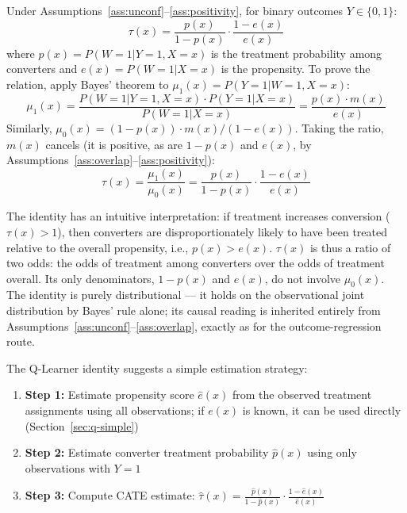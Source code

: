 \documentclass{article}
\begin{document}
Under Assumptions~\ref{ass:unconf}--\ref{ass:positivity}, for binary
outcomes $Y \in \{0,1\}$:
\begin{equation}
\label{eq:q-identity}
\tau(x) = \frac{p(x)}{1-p(x)} \cdot \frac{1-e(x)}{e(x)}
\end{equation}
where $p(x) = P(W{=}1|Y{=}1,X{=}x)$ is the treatment probability among
converters and $e(x) = P(W{=}1|X{=}x)$ is the propensity. To prove the
relation, apply Bayes' theorem to
$\mu_1(x) = P(Y{=}1|W{=}1,X{=}x)$:
\begin{equation}
\mu_1(x) = \frac{P(W{=}1|Y{=}1,X{=}x) \cdot P(Y{=}1|X{=}x)}{P(W{=}1|X{=}x)}
          = \frac{p(x) \cdot m(x)}{e(x)}
\end{equation}
Similarly, $\mu_0(x) = (1-p(x)) \cdot m(x) / (1-e(x))$. Taking the
ratio, $m(x)$ cancels (it is positive, as are $1-p(x)$ and $e(x)$, by
Assumptions~\ref{ass:overlap}--\ref{ass:positivity}):
\begin{equation}
\tau(x) = \frac{\mu_1(x)}{\mu_0(x)}
         = \frac{p(x)}{1-p(x)} \cdot \frac{1-e(x)}{e(x)}
\end{equation}

The identity has an intuitive interpretation: if treatment increases
conversion ($\tau(x) > 1$), then converters are disproportionately likely
to have been treated relative to the overall propensity, i.e.,
$p(x) > e(x)$. $\tau(x)$ is thus a ratio of two odds: the odds of
treatment among converters over the odds of treatment overall. Its only
denominators, $1-p(x)$ and $e(x)$, do not involve $\mu_0(x)$. The identity
is purely distributional --- it holds on the observational joint
distribution by Bayes' rule alone; its causal reading is inherited
entirely from Assumptions~\ref{ass:unconf}--\ref{ass:overlap}, exactly as
for the outcome-regression route.

The Q-Learner identity suggests a simple estimation strategy:
\begin{enumerate}
\item \textbf{Step 1:} Estimate propensity score $\hat{e}(x)$ from the
observed treatment assignments using all observations; if $e(x)$ is
known, it can be used directly (Section~\ref{sec:q-simple})
\item \textbf{Step 2:} Estimate converter treatment probability
$\hat{p}(x)$ using only observations with $Y=1$
\item \textbf{Step 3:} Compute CATE estimate:
$\hat{\tau}(x) = \frac{\hat{p}(x)}{1-\hat{p}(x)} \cdot
\frac{1-\hat{e}(x)}{\hat{e}(x)}$
\end{enumerate}
\end{document}
